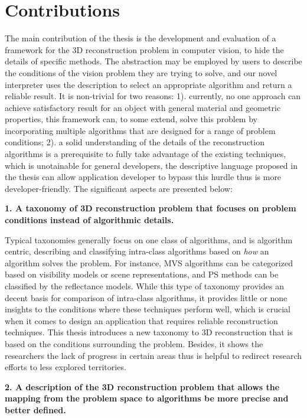 \section{Contributions}
The main contribution of the thesis is the development and evaluation of a framework for the 3D reconstruction problem in computer vision, to hide the details of specific methods. The abstraction may be employed by users to describe the conditions of the vision problem they are trying to solve, and our novel interpreter uses the description to select an appropriate algorithm and return a reliable result. It is non-trivial for two reasons: 1). currently, no one approach can achieve satisfactory result for an object with general material and geometric properties, this framework can, to some extend, solve this problem by incorporating multiple algorithms that are designed for a range of problem conditions; 2). a solid understanding of the details of the reconstruction algorithms is a prerequisite to fully take advantage of the existing techniques, which is unotainable for general developers, the descriptive language proposed in the thesis can allow application developer to bypass this hurdle thus is more developer-friendly. The significant aspects are presented below:

\noindent\textbf{1. A taxonomy of 3D reconstruction problem that focuses on problem conditions instead of algorithmic details.}

Typical taxonomies generally focus on one class of algorithms, and is algorithm centric, describing and classifying intra-class algorithms based on \textit{how} an algorithm solves the problem. For instance, MVS algorithms can be categorized based on visibility models or scene representations, and PS methods can be classified by the reflectance models. While this type of taxonomy provides an decent basis for comparison of intra-class algorithms, it provides little or none insights to the conditions where these techniques perform well, which is crucial when it comes to design an application that requires reliable reconstruction techniques. This thesis introduces a new taxonomy to 3D reconstruction that is based on the conditions surrounding the problem. Besides, it shows the researchers the lack of progress in certain areas thus is helpful to redirect research efforts to less explored territories.

\noindent\textbf{2. A description of the 3D reconstruction problem that allows the mapping from the problem space to algorithms be more precise and better defined.}

